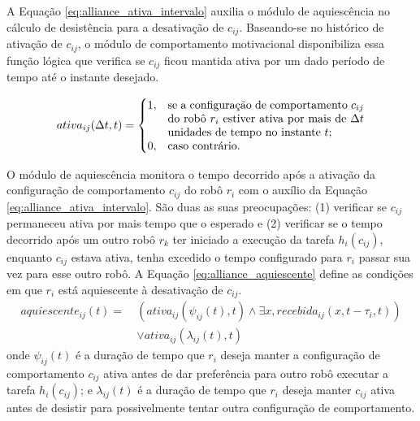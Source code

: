             A Equação \ref{eq:alliance_ativa_intervalo} auxilia o módulo de aquiescência no cálculo de desistência para a desativação de $c_{ij}$. Baseando-se no histórico de ativação de $c_{ij}$, o módulo de comportamento motivacional disponibiliza essa função lógica que verifica se $c_{ij}$ ficou mantida ativa por um dado período de tempo até o instante desejado.
            
            \begin{equation} \label{eq:alliance_ativa_intervalo}
                ativa_{ij}(\Delta t, t) =
                \begin{cases}
                    1, & \parbox[t]{.5\textwidth}{se a configuração de comportamento $c_{ij}$ do robô $r_i$ estiver ativa por mais de $\Delta t$ unidades de tempo no instante $t$;} \\
                    0, & \text{caso contrário.}
                \end{cases}
            \end{equation}
            
            O módulo de aquiescência monitora o tempo decorrido após a ativação da configuração de comportamento $c_{ij}$ do robô $r_i$ com o auxílio da Equação \ref{eq:alliance_ativa_intervalo}. São duas as suas preocupações: (1) verificar se $c_{ij}$ permaneceu ativa por mais tempo que o esperado e (2) verificar se o tempo decorrido após um outro robô $r_k$ ter iniciado a execução da tarefa $h_i(c_{ij})$, enquanto $c_{ij}$ estava ativa, tenha excedido o tempo configurado para $r_i$ passar sua vez para esse outro robô. A Equação \ref{eq:alliance_aquiescente} define as condições em que $r_i$ está aquiescente à desativação de $c_{ij}$.
            \begin{equation} \label{eq:alliance_aquiescente}
                \begin{aligned}
                    aquiescente_{ij}(t) = \
                    & (ativa_{ij}(\psi_{ij}(t), t) \land \exists x, recebida_{ij}(x, t - \tau_i, t)) \\
                    & \lor ativa_{ij}(\lambda_{ij}(t), t)
                \end{aligned}
            \end{equation}
            onde $\psi_{ij}(t)$ é a duração de tempo que $r_i$ deseja manter a configuração de comportamento $c_{ij}$ ativa antes de dar preferência para outro robô executar a tarefa $h_i(c_{ij})$; e $\lambda_{ij}(t)$ é a duração de tempo que $r_i$ deseja manter $c_{ij}$ ativa antes de desistir para possivelmente tentar outra configuração de comportamento.
            
